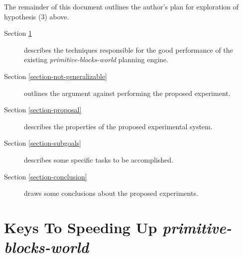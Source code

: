 \documentclass{article}
\newcommand{\sbw}{{\em primitive-blocks-world}}
\begin{document}
The remainder of this document outlines the author's plan for
exploration of hypothesis (3) above.
\begin{description}
\item[Section \ref{section-sbw-techniques}]
describes the techniques responsible for the
good performance of the existing \sbw{}
planning engine.
\item[Section \ref{section-not-generalizable}]
outlines the argument against performing the proposed experiment.
\item[Section \ref{section-proposal}]
describes the properties of the proposed experimental system.
\item[Section \ref{section-subgoals}]
describes some specific tasks to be accomplished.
\item[Section \ref{section-conclusion}]
draws some conclusions about the proposed experiments.
\end{description}

\section{Keys To Speeding Up \sbw{}}
\label{section-sbw-techniques}
\end{document}
